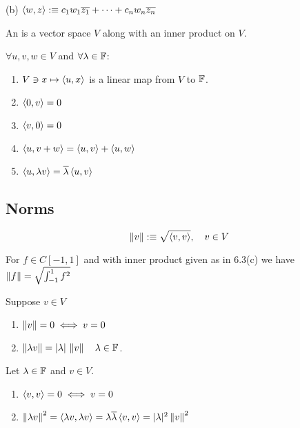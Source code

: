 \begin{example}
  (b) $\left \langle w, z \right \rangle :\equiv c_1 w_1 \overline{z_1} + \cdots + c_n w_n \overline{z_n}$
\end{example}

\begin{mydef}
  An  is a vector space $V$ along with an inner product on $V$.
\end{mydef}

\setcounter{thm}{5}

\begin{thm}
  $\forall u,v,w \in V$ and $\forall \lambda \in \mathbb{F}$:  
  \begin{enumerate}[label=(\alph*)]
    \item $V \ni x \mapsto \left \langle u, x \right \rangle$ is a linear map from $V$ to $\mathbb{F}$.
    \item $\left \langle 0, v \right \rangle = 0 $
    \item $\left \langle v, 0 \right \rangle = 0$
    \item $\left \langle u, v+w \right \rangle = \left \langle u, v \right \rangle + \left \langle u, w \right \rangle $
    \item $\left \langle u, \lambda v \right \rangle = \overline{\lambda} \left \langle u, v \right \rangle$
  \end{enumerate}
\end{thm}

\subsection{Norms}

\begin{mydef} [norm]
  \begin{equation}
    \left \lVert v \right \rVert :\equiv \sqrt{\left \langle v, v \right \rangle}, \quad v \in  V
  \end{equation}
\end{mydef}

\begin{example}
  For $f \in C[-1,1]$ and with inner product given as in 6.3(c) we have $\left \lVert f \right \rVert = \sqrt { \int_{-1}^{1} f^2}$

\end{example}

\begin{thm} 
  Suppose $v \in V$
  \begin{enumerate}[label=(\alph*)]
    \item $\left \lVert v \right \rVert = 0 \iff v = 0$
    \item $\left \lVert \lambda v \right \rVert = |\lambda| \,\left \lVert v \right \rVert \quad \lambda \in \mathbb{F}$.
  \end{enumerate}
\end{thm}
\begin{prf}
  Let $\lambda \in \mathbb{F}$ and $v \in V$.
  \begin{enumerate}[label=(\alph*)]
    \item $\left \langle v, v \right \rangle = 0 \iff v=0$
    \item $\left \lVert \lambda v \right \rVert^2 = \left \langle \lambda v, \lambda v \right \rangle = \lambda \overline{\lambda} \left \langle v, v \right \rangle = |\lambda|^2 \left \lVert v \right \rVert^2$
  \end{enumerate}
  \vspace{-1em}
\end{prf}

